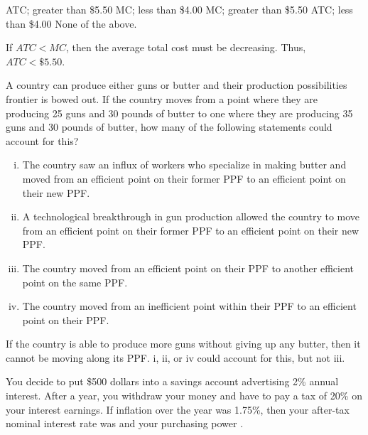 \documentclass[addpoints,11pt]{exam}
\theoremstyle{definition}
\newcommand{\blank}[0]{\underline{\hspace{3cm}}}
\begin{document}
\begin{questions}
\begin{choices}
\choice ATC; greater than \$5.50
\choice MC; less than \$4.00
\choice MC; greater than \$5.50
\choice ATC; less than \$4.00
\CorrectChoice None of the above.
\end{choices}

\begin{solution}
If $ATC<MC$, then the average total cost must be decreasing. Thus, $ATC<\$5.50$.
\end{solution}

\question A country can produce either guns or butter and their production possibilities frontier is bowed out. If the country moves from a point where they are producing 25 guns and 30 pounds of butter to one where they are producing 35 guns and 30 pounds of butter, how many of the following statements could account for this?

\begin{enumerate}[i.]
	\item The country saw an influx of workers who specialize in making butter and moved from an efficient point on their former PPF to an efficient point on their new PPF.
	\item A technological breakthrough in gun production allowed the country to move from an efficient point on their former PPF to an efficient point on their new PPF. 
	\item The country moved from an efficient point on their PPF to another efficient point on the same PPF.
	\item The country moved from an inefficient point within their PPF to an efficient point on their PPF.
\end{enumerate}

\begin{choices}
\end{choices}

\begin{solution}
If the country is able to produce more guns without giving up any butter, then it cannot be moving along its PPF. i, ii, or iv could account for this, but not iii.
\end{solution}

\question You decide to put \$500 dollars into a savings account advertising 2\% annual interest. After a year, you withdraw your money and have to pay a tax of 20\% on your interest earnings. If inflation over the year was 1.75\%, then your after-tax nominal interest rate was \blank and your purchasing power \blank.


\end{questions}
\end{document}
